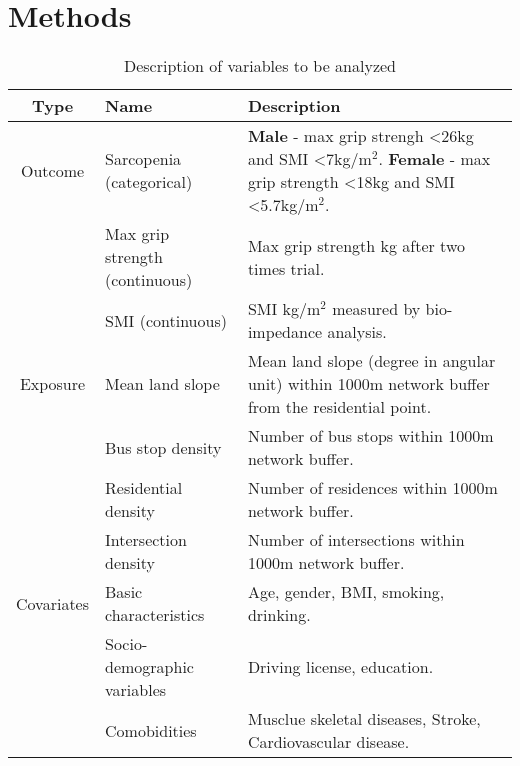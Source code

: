 \documentclass{article}
\begin{document}
\section{Methods}
		\begin{table}[H]
			\caption{Description of variables to be analyzed}
			\centering
			\begin{tabular}{ c l p{5cm} }
				\hline 
				Type & Name & Description \\
				\hline \hline
				Outcome & Sarcopenia (categorical) & 
				\textbf{Male} - max grip strengh \textless26kg and SMI \textless7kg/m$^2$. \textbf{Female} - max grip strength \textless18kg and SMI \textless5.7kg/m$^2$.\\
					& Max grip strength (continuous) & Max grip strength kg after two times trial. \\
					& SMI (continuous) & SMI kg/m$^2$ measured by bio-impedance analysis. \\
				\hline
				Exposure& Mean land slope & Mean land slope (degree in angular unit) within 1000m network buffer from the residential point. \\
					& Bus stop density & Number of bus stops within 1000m network buffer. \\
					& Residential density & Number of residences within 1000m network buffer. \\
					& Intersection density & Number of intersections within 1000m network buffer. \\
				\hline
				Covariates & Basic characteristics & Age, gender, BMI, smoking, drinking. \\
					   & Socio-demographic variables & Driving license, education. \\
					   & Comobidities & Musclue skeletal diseases, Stroke, Cardiovascular disease. \\
				\hline
			\end{tabular}
		\end{table}

		
\end{document}

